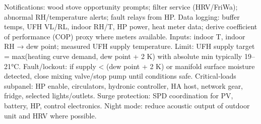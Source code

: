 \markdownRendererUlItem Notifications: wood stove opportunity prompts; filter service (HRV/FriWa); abnormal RH/temperature alerts; fault relays from HP.\markdownRendererUlItemEnd 
\markdownRendererUlItem Data logging: buffer temps, UFH VL/RL, indoor RH/T, HP power, heat meter data; derive coefficient of performance (COP) proxy where meters available.\markdownRendererUlItemEnd 
\markdownRendererUlEndTight \markdownRendererInterblockSeparator
{}
\markdownRendererSectionEnd \markdownRendererSectionBegin
{}\markdownRendererInterblockSeparator
{}\markdownRendererUlBeginTight
\markdownRendererUlItem Inputs: indoor T, indoor RH → dew point; measured UFH supply temperature.\markdownRendererUlItemEnd 
\markdownRendererUlItem Limit: UFH supply target = max(heating curve demand, dew point + 2 K) with absolute min typically 19–21°C.\markdownRendererUlItemEnd 
\markdownRendererUlItem Fault/lockout: if supply < (dew point + 2 K) or manifold surface moisture detected, close mixing valve/stop pump until conditions safe.\markdownRendererUlItemEnd 
\markdownRendererUlEndTight \markdownRendererInterblockSeparator
{}
\markdownRendererSectionEnd \markdownRendererSectionBegin
{}\markdownRendererInterblockSeparator
{}\markdownRendererUlBeginTight
\markdownRendererUlItem Critical‑loads subpanel: HP enable, circulators, hydronic controller, HA host, network gear, fridge, selected lights/outlets.\markdownRendererUlItemEnd 
\markdownRendererUlItem Surge protection: SPD coordination for PV, battery, HP, control electronics.\markdownRendererUlItemEnd 
\markdownRendererUlItem Night mode: reduce acoustic output of outdoor unit and HRV where possible.\markdownRendererUlItemEnd 
\markdownRendererUlEndTight 
\markdownRendererSectionEnd 
\markdownRendererSectionEnd \markdownRendererDocumentEnd